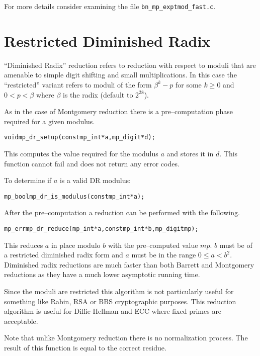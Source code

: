 \documentclass[synpaper]{book}
\begin{document}
For more details consider examining the file \texttt{bn\_mp\_exptmod\_fast.c}.

\section{Restricted Diminished Radix}

``Diminished Radix'' reduction refers to reduction with respect to moduli that are amenable to simple
digit shifting and small multiplications.  In this case the ``restricted'' variant refers to moduli of the
form $\beta^k - p$ for some $k \ge 0$ and $0 < p < \beta$ where $\beta$ is the radix (default to $2^{28}$).

As in the case of Montgomery reduction there is a pre--computation phase required for a given modulus.

\begin{alltt}
void mp_dr_setup(const mp_int *a, mp_digit *d);
\end{alltt}

This computes the value required for the modulus $a$ and stores it in $d$.  This function cannot fail
and does not return any error codes.

To determine if $a$ is a valid DR modulus:
\begin{alltt}
mp_bool mp_dr_is_modulus(const mp_int *a);
\end{alltt}

After the pre--computation a reduction can be performed with the following.

\begin{alltt}
mp_err mp_dr_reduce(mp_int *a, const mp_int *b, mp_digit mp);
\end{alltt}

This reduces $a$ in place modulo $b$ with the pre--computed value $mp$.  $b$ must be of a restricted
diminished radix form and $a$ must be in the range $0 \le a < b^2$.  Diminished radix reductions are
much faster than both Barrett and Montgomery reductions as they have a much lower asymptotic running time.

Since the moduli are restricted this algorithm is not particularly useful for something like Rabin, RSA or
BBS cryptographic purposes.  This reduction algorithm is useful for Diffie-Hellman and ECC where fixed
primes are acceptable.

Note that unlike Montgomery reduction there is no normalization process.  The result of this function is
equal to the correct residue.
\end{document}
